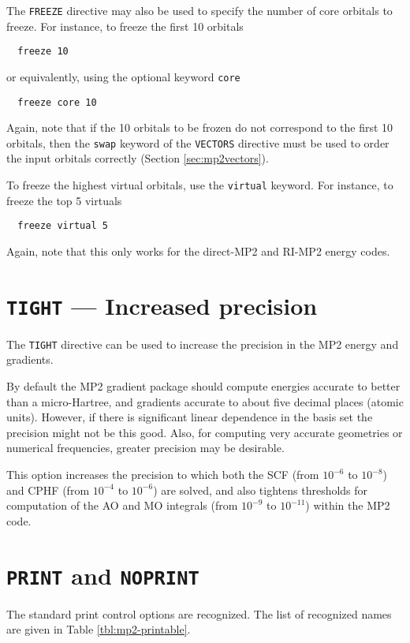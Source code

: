 The \verb+FREEZE+ directive may also be used to specify the number of 
core orbitals to freeze.  For instance, to freeze the first 10 orbitals
\begin{verbatim}
  freeze 10
\end{verbatim}
or equivalently, using the optional keyword \verb+core+
\begin{verbatim}
  freeze core 10
\end{verbatim}
Again, note that if the 10 orbitals to be frozen do not correspond to
the first 10 orbitals, then the \verb+swap+ keyword of the
\verb+VECTORS+ directive must be used to order the input orbitals
correctly (Section \ref{sec:mp2vectors}).

To freeze the highest virtual orbitals, use the \verb+virtual+
keyword.  For instance, to freeze the top 5 virtuals
\begin{verbatim}
  freeze virtual 5
\end{verbatim}
Again, note that this only works for the direct-MP2 and RI-MP2 energy
codes.

\section{{\tt TIGHT} --- Increased precision}

The \verb+TIGHT+ directive can be used to increase the precision
in the MP2 energy and gradients.

By default the MP2 gradient package should compute energies accurate
to better than a micro-Hartree, and gradients accurate to about five
decimal places (atomic units).  However, if there is significant
linear dependence in the basis set the precision might not be this
good.  Also, for computing very accurate geometries or numerical
frequencies, greater precision may be desirable.

 This option increases the precision to which both the SCF (from
$10^{-6}$ to $10^{-8}$) and CPHF (from $10^{-4}$ to $10^{-6}$) are
solved, and also tightens thresholds for computation of the AO and MO
integrals (from $10^{-9}$ to $10^{-11}$) within the MP2 code.

\section{{\tt PRINT} and {\tt NOPRINT}}

The standard print control options are recognized.  The list of
recognized names are given in Table \ref{tbl:mp2-printable}.

